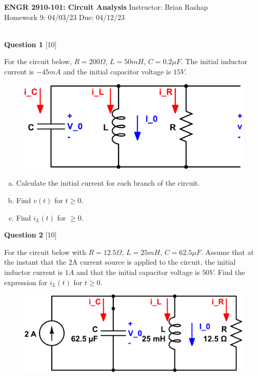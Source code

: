 \documentclass[12pt]{article}
\begin{document}
\begin{center}
\hfil
{\large\bf {ENGR 2910-101: Circuit Analysis}}
\hfill Instructor: Brian Rashap\\
Homework 9: 04/03/23 \hfill Due: 04/12/23\\
\hrulefill\\
\end{center}

{\bf Question 1} [10] %

For the circuit below, $R = 200 \Omega$, $L = 50 mH$, $C=0.2\mu F$. The initial inductor current is $-45mA$ and the initial capacitor voltage is $15V$. 

\begin{figure}[h!]
\begin{center}
 \includegraphics[scale=0.4]{fig8_1.png}
\end{center}
\end{figure}

\begin{enumerate}[(a)]
\item Calculate the initial current for each branch of the circuit.
\item Find $v(t)$ for $t \geq 0$.
\item Find $i_L(t)$ for $ \geq 0$.
\end{enumerate}


\vspace{0.1in}


{\bf Question 2} [10] %

For the circuit below with $R = 12.5 \Omega$, $L = 25 mH$, $C=62.5\mu F$. Assume that at the instant that the 2A current source is applied to the circuit, the initial inductor current is $1A$ and that the initial capacitor voltage is $50 V$.
Find the expression for $i_L(t)$ for $t \geq 0$. 

\begin{figure}[h!]
\begin{center}
 \includegraphics[scale=0.6]{fig8_32.png}
\end{center}
\end{figure}
\end{document}
